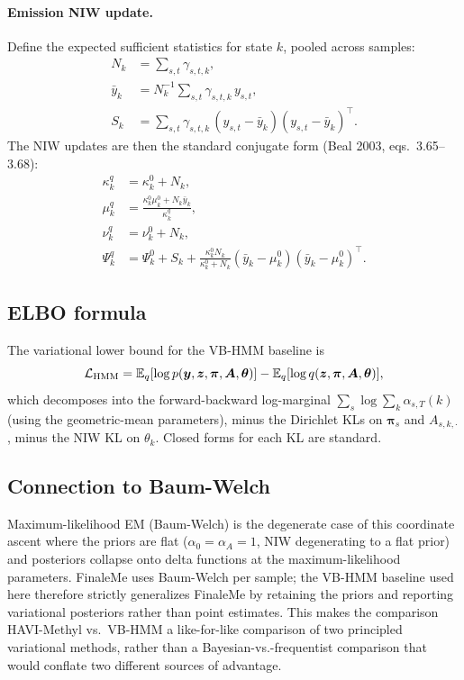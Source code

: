 \paragraph{Emission NIW update.} Define the expected sufficient statistics for state $k$, pooled across samples:
\begin{align}
N_k &= \sum_{s,t} \gamma_{s,t,k},\\
\bar y_k &= N_k^{-1}\sum_{s,t}\gamma_{s,t,k}\,y_{s,t},\\
S_k &= \sum_{s,t}\gamma_{s,t,k}\,(y_{s,t}-\bar y_k)(y_{s,t}-\bar y_k)^\top.
\end{align}
The NIW updates are then the standard conjugate form (Beal 2003, eqs.~3.65--3.68):
\begin{align}
\kappa^q_k &= \kappa^0_k + N_k,\\
\mu^q_k &= \frac{\kappa^0_k\mu^0_k + N_k\bar y_k}{\kappa^q_k},\\
\nu^q_k &= \nu^0_k + N_k,\\
\Psi^q_k &= \Psi^0_k + S_k + \frac{\kappa^0_k N_k}{\kappa^0_k + N_k}(\bar y_k - \mu^0_k)(\bar y_k - \mu^0_k)^\top.
\end{align}

\subsection*{ELBO formula}
The variational lower bound for the VB-HMM baseline is
\begin{equation}
\mathcal{L}_{\mathrm{HMM}} = \mathbb{E}_q[\log p(\bm y,\bm z,\bm\pi,\bm A,\bm\theta)] - \mathbb{E}_q[\log q(\bm z,\bm\pi,\bm A,\bm\theta)],
\end{equation}
which decomposes into the forward-backward log-marginal $\sum_s\log\sum_k\alpha_{s,T}(k)$ (using the geometric-mean parameters), minus the Dirichlet KLs on $\bm\pi_s$ and $A_{s,k,\cdot}$, minus the NIW KL on $\theta_k$. Closed forms for each KL are standard.

\subsection*{Connection to Baum-Welch}
Maximum-likelihood EM (Baum-Welch) is the degenerate case of this coordinate ascent where the priors are flat ($\alpha_0=\alpha_A=1$, NIW degenerating to a flat prior) and posteriors collapse onto delta functions at the maximum-likelihood parameters. FinaleMe uses Baum-Welch per sample; the VB-HMM baseline used here therefore strictly generalizes FinaleMe by retaining the priors and reporting variational posteriors rather than point estimates. This makes the comparison HAVI-Methyl vs.\ VB-HMM a like-for-like comparison of two principled variational methods, rather than a Bayesian-vs.-frequentist comparison that would conflate two different sources of advantage.

